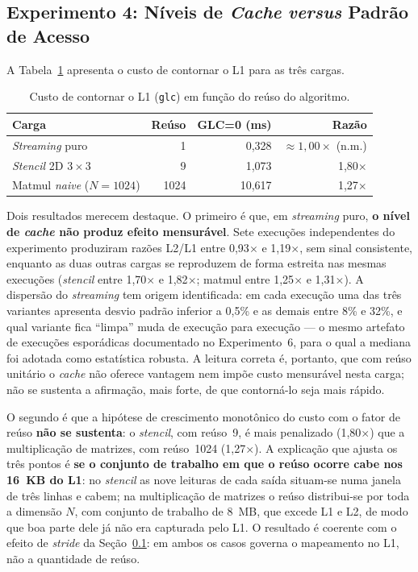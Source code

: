 
\subsection{Experimento 4: Níveis de \textit{Cache} \textit{versus} Padrão de Acesso}
\label{sec:niveis}

A Tabela~\ref{tab:reuso} apresenta o custo de contornar o L1 para as três cargas.

\begin{table}[ht]
\centering
\caption{Custo de contornar o L1 (\texttt{glc}) em função do reúso do algoritmo.}
\label{tab:reuso}
\small
\begin{tabular}{@{}lrrr@{}}
\toprule
\textbf{Carga} & \textbf{Reúso} & \textbf{GLC=0 (ms)} & \textbf{Razão} \\
\midrule
\textit{Streaming} puro & 1 & 0,328 & $\approx 1,00\times$ (n.m.) \\
\textit{Stencil} 2D $3\times3$ & 9 & 1,073 & 1,80$\times$ \\
Matmul \textit{naive} ($N=1024$) & 1024 & 10,617 & 1,27$\times$ \\
\bottomrule
\end{tabular}
\end{table}

Dois resultados merecem destaque. O primeiro é que, em \textit{streaming} puro, \textbf{o nível de \textit{cache} não produz efeito mensurável}. Sete execuções independentes do experimento produziram razões L2/L1 entre 0,93$\times$ e 1,19$\times$, sem sinal consistente, enquanto as duas outras cargas se reproduzem de forma estreita nas mesmas execuções (\textit{stencil} entre 1,70$\times$ e 1,82$\times$; matmul entre 1,25$\times$ e 1,31$\times$). A dispersão do \textit{streaming} tem origem identificada: em cada execução uma das três variantes apresenta desvio padrão inferior a 0,5\% e as demais entre 8\% e 32\%, e qual variante fica ``limpa'' muda de execução para execução --- o mesmo artefato de execuções esporádicas documentado no Experimento~6, para o qual a mediana foi adotada como estatística robusta. A leitura correta é, portanto, que com reúso unitário o \textit{cache} não oferece vantagem nem impõe custo mensurável nesta carga; não se sustenta a afirmação, mais forte, de que contorná-lo seja mais rápido.

O segundo é que a hipótese de crescimento monotônico do custo com o fator de reúso \textbf{não se sustenta}: o \textit{stencil}, com reúso~9, é mais penalizado (1,80$\times$) que a multiplicação de matrizes, com reúso~1024 (1,27$\times$). A explicação que ajusta os três pontos é \textbf{se o conjunto de trabalho em que o reúso ocorre cabe nos 16~KB do L1}: no \textit{stencil} as nove leituras de cada saída situam-se numa janela de três linhas e cabem; na multiplicação de matrizes o reúso distribui-se por toda a dimensão $N$, com conjunto de trabalho de 8~MB, que excede L1 e L2, de modo que boa parte dele já não era capturada pelo L1. O resultado é coerente com o efeito de \textit{stride} da Seção~\ref{sec:niveis}: em ambos os casos governa o mapeamento no L1, não a quantidade de reúso.

